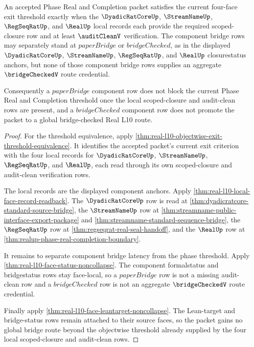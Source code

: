 \begin{theorem}
\label{thm:real-l10-component-bridge-latency}
An accepted Phase Real and Completion packet satisfies the current four-face
exit threshold exactly when the $\DyadicRatCoreUp$, $\StreamNameUp$,
$\RegSeqRatUp$, and $\RealUp$ local records each provide the required
scoped-closure row and at least $\auditCleanV$ verification. The component
bridge rows may separately stand at $paperBridge$ or $bridgeChecked$, as in
the displayed $\DyadicRatCoreUp$, $\StreamNameUp$, $\RegSeqRatUp$, and
$\RealUp$ closurestatus anchors, but none of those component bridge rows
supplies an aggregate $\bridgeCheckedV$ route credential.

Consequently a $paperBridge$ component row does not block the current Phase
Real and Completion threshold once the local scoped-closure and audit-clean
rows are present, and a $bridgeChecked$ component row does not promote the
packet to a global bridge-checked Real L10 route.
\end{theorem}
\begin{proof}
For the threshold equivalence, apply
\autoref{thm:real-l10-objectwise-exit-threshold-equivalence}. It identifies
the accepted packet's current exit criterion with the four local records for
$\DyadicRatCoreUp$, $\StreamNameUp$, $\RegSeqRatUp$, and $\RealUp$, each read
through its own scoped-closure and audit-clean verification rows.

The local records are the displayed component anchors. Apply
\autoref{thm:real-l10-local-face-record-readback}. The $\DyadicRatCoreUp$
row is read at \autoref{thm:dyadicratcore-standard-source-bridge}, the
$\StreamNameUp$ row at
\autoref{thm:streamname-public-interface-export-package} and
\autoref{thm:streamname-standard-sequence-bridge}, the $\RegSeqRatUp$ row at
\autoref{thm:regseqrat-real-seal-handoff}, and the $\RealUp$ row at
\autoref{thm:realup-phase-real-completion-boundary}.

It remains to separate component bridge latency from the phase threshold.
Apply \autoref{thm:real-l10-face-status-noncollapse}. The component
formalstatus and bridgestatus rows stay face-local, so a $paperBridge$ row is
not a missing audit-clean row and a $bridgeChecked$ row is not an aggregate
$\bridgeCheckedV$ route credential.

Finally apply \autoref{thm:real-l10-face-leantarget-noncollapse}. The
Lean-target and bridge-status rows remain attached to their source faces, so
the packet gains no global bridge route beyond the objectwise threshold
already supplied by the four local scoped-closure and audit-clean rows.
\end{proof}

